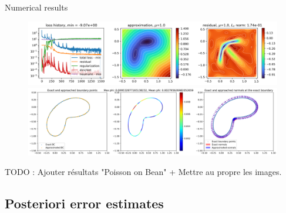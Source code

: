 \begin{frame}{Numerical results}		
    \begin{figure}[!ht] \centering
		\includegraphics[width=\linewidth]{images/newlines/levelset/EikonalBean_curvature.png}


		\includegraphics[width=\linewidth]{images/newlines/levelset/boundary_curvature.png}
	\end{figure}

    \vspace{-5pt}
    TODO : Ajouter résultats "Poisson on Bean" + Mettre au propre les images. 
\end{frame}

\subsection{\filledstar Posteriori error estimates}


